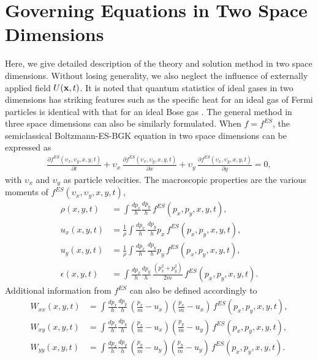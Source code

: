 \documentclass{rsproca}%
\begin{document}
\section{Governing Equations in Two Space Dimensions}
\label{sec:3}
Here, we give detailed description of the theory and solution method in two space dimensions.  Without losing generality, we also neglect the influence of externally applied field \(U({\bf x},t)\).  It is noted that quantum statistics of ideal gases in two dimensions has striking features such as the specific heat for an ideal gas of Fermi particles is identical with that for an ideal Bose gas \cite{May1964}. The general method in three space dimensions can also be similarly formulated.   When $f=f^{ES}$, the semiclassical Boltzmann-ES-BGK equation in two space dimensions can be expressed as
\begin{align}
\frac{\partial f^{ES}({\upsilon}_x,{\upsilon}_y, x, y, t)}{\partial t} + {\upsilon}_x\,\frac{\partial f^{ES}({\upsilon}_x,{\upsilon}_y, x, y, t)}{\partial x } + {\upsilon}_y\,\frac{\partial f^{ES}({\upsilon}_x,{\upsilon}_y, x, y, t)} {\partial y} =0, \label{normalizedes}
\end{align}
with ${\upsilon}_x$ and ${\upsilon}_y$ as particle velocities.   The macroscopic properties are the various moments of $f^{ES}({\upsilon}_x,{\upsilon}_y,x,y,t)$,
\begin{subequations}
\begin{align}
\rho (x,y,t) 			&= \int \frac{ d p_x}{h} \frac{ d p_y}{h} \, f^{ES}(p_x, p_y, x, y, t), \\
u_x (x,y,t) 			&= \frac{1}{\rho} \int 	 \frac{ d p_x}{h} \, \frac{ d p_y}{h}  p_x \, f^{ES}(p_x, p_y, x, y, t), \\
u_y (x,y,t) 			&= \frac{1}{\rho} \int 	 \frac{ d p_x}{h} \, \frac{ d p_y}{h}  p_y \, f^{ES}(p_x, p_y, x, y, t), \\
\epsilon (x,y,t) 	&= \int \frac{ d p_x}{h} \frac{ d p_y}{h} \, \frac{(p_x^2 + p_y^2)}{2m} \, f^{ES}(p_x, p_y, x, y, t).
\end{align}
\end{subequations}
Additional information from $f^{ES}$ can also be defined accordingly to
\begin{subequations}
\begin{align}
W_{x x}(x,y,t)	&=	\int \frac{ d p_x}{h} \frac{ d p_y}{h} \, (\frac{p_x}{m}-u_x)(\frac{p_x}{m}-u_x)\,f^{ES}(p_x, p_y, x, y, t), \\
W_{x y}(x,y,t)	&=	\int \frac{ d p_x}{h} \frac{ d p_y}{h} \, (\frac{p_x}{m}-u_x)(\frac{p_y}{m}-u_y)\,f^{ES}(p_x, p_y, x, y, t), \\
W_{y y}(x,y,t)	&=	\int \frac{ d p_x}{h} \frac{ d p_y}{h} \, (\frac{p_y}{m}-u_y)(\frac{p_y}{m}-u_y)\,f^{ES}(p_x, p_y, x, y, t).
\end{align}
\end{subequations}
\end{document}
